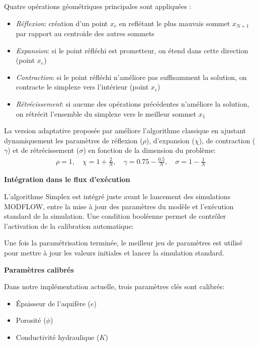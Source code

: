 Quatre opérations géométriques principales sont appliquées \parencite{gaoImplementingNelderMeadSimplex2012}:
\begin{itemize}[leftmargin=1.5cm]
    \item \textit{Réflexion}: création d'un point $x_r$ en reflétant le plus mauvais sommet $x_{N+1}$ par rapport au centroïde des autres sommets
    \item \textit{Expansion}: si le point réfléchi est prometteur, on étend dans cette direction (point $x_e$)
    \item \textit{Contraction}: si le point réfléchi n'améliore pas suffisamment la solution, on contracte le simplexe vers l'intérieur (point $x_c$)
    \item \textit{Rétrécissement}: si aucune des opérations précédentes n'améliore la solution, on rétrécit l'ensemble du simplexe vers le meilleur sommet $x_1$
\end{itemize}

La version adaptative proposée par \textcite{gaoImplementingNelderMeadSimplex2012} améliore l'algorithme classique en ajustant dynamiquement les paramètres de réflexion ($\rho$), d'expansion ($\chi$), de contraction ($\gamma$) et de rétrécissement ($\sigma$) en fonction de la dimension du problème:
\begin{align}
\rho = 1, \quad \chi = 1 + \frac{2}{N}, \quad \gamma = 0.75 - \frac{0.5}{N}, \quad \sigma = 1 - \frac{1}{N}
\end{align}

\vspace{2em}
\noindent\textbf{Intégration dans le flux d'exécution}

L'algorithme Simplex est intégré juste avant le lancement des simulations MODFLOW, entre la mise à jour des paramètres du modèle et l'exécution standard de la simulation. Une condition booléenne permet de contrôler l'activation de la calibration automatique:


Une fois la paramétrisation terminée, le meilleur jeu de paramètres est utilisé pour mettre à jour les valeurs initiales et lancer la simulation standard.

\vspace{2em}
\noindent\textbf{Paramètres calibrés}

Dans notre implémentation actuelle, trois paramètres clés sont calibrés:
\begin{itemize}
\item Épaisseur de l'aquifère ($e$)
\item Porosité ($\phi$)
\item Conductivité hydraulique ($K$)
\end{itemize}

